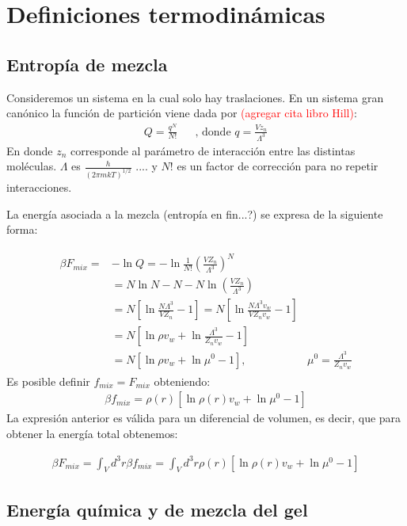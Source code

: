 \chapter{Definiciones termodin\'amicas } \label{anexo-definiciones}
 
\section{Entrop\'ia de mezcla}
Consideremos un sistema en la cual solo hay traslaciones.
En un sistema gran can\'onico la funci\'on de partici\'on viene dada por \textcolor{red}{(agregar cita libro Hill)}:
\begin{align}
	Q=\frac{q^N}{N !} && \text{, donde $q=\frac{Vz_n}{\Lambda^3}$} 
\end{align}
En donde $z_n$ corresponde al par\'ametro de  interacci\'on entre las distintas mol\'eculas. $\Lambda$ es $\frac{h}{(2\pi mkT)^{1/2}}$ .... y  $N!$  es un factor de correcci\'on para no repetir interacciones.

La energ\'ia asociada a la mezcla (entrop\'ia en fin...?) se expresa de la siguiente forma:

\begin{align}
	\begin{aligned}
		\beta F_{mix}=&-\ln Q =-\ln\frac{1}{N!}\left(\frac{VZ_n}{\Lambda^3}\right)^N \\
		&= N\ln N -N -N\ln\left(\frac{VZ_n}{\Lambda^3}\right) \\
		&=N\left[\ln\frac{N\Lambda^3}{VZ_n} -1\right]= N\left[\ln\frac{N\Lambda^3v_w}{VZ_nv_w} -1\right] \\
		&=N\left[\ln\rho v_w + \ln\frac{\Lambda^3}{Z_nv_w} -1\right] \\
		&=N\left[\ln\rho v_w + \ln\mu^0 -1\right], & \mu^0=\frac{\Lambda^3}{Z_nv_w}
	\end{aligned}
\end{align}
Es posible definir $f_{mix}=F_{mix}$ obteniendo: 
\begin{align}
	\beta f_{mix}=\rho(r)\left[\ln\rho(r) v_w + \ln\mu^0 -1\right] 
\end{align}
La expresi\'on anterior es v\'alida para un diferencial de volumen, es decir, que para obtener la energ\'ia total obtenemos:

\begin{align}
	\beta F_{mix}=\int_V{d^3r\beta f_{mix}}=\int_V{d^3r\rho(r)\left[\ln\rho(r) v_w + \ln\mu^0 -1\right]} 
\end{align}


\section{Energ\'ia qu\'imica y de mezcla del gel}

